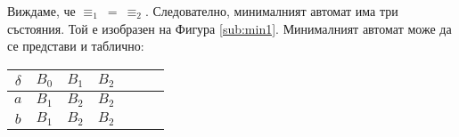 \begin{example}
\begin{itemize}
  Виждаме, че $\equiv_1\ =\ \equiv_2$.
  Следователно, минималният автомат има три състояния.
  Той е изобразен на Фигура \ref{sub:min1}.  
  Минималният автомат може да се представи и таблично:
  
  \begin{tabular}{|c|c|c|c|c|c|c|}
    \hline
    $\delta$ & $B_0$ & $B_1$ & $B_2$ \\
    \hline
    $a$ & $B_1$ & $B_2$ & $B_2$ \\
    \hline
    $b$ & $B_1$ & $B_2$ & $B_2$ \\
    \hline
  \end{tabular}
\end{itemize}
\end{example}

